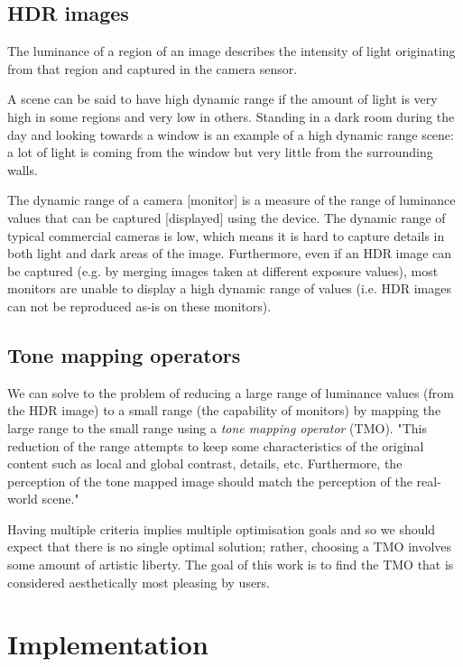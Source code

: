 \documentclass[a4paper]{scrartcl}
\begin{document}
\subsection{HDR images}

The luminance of a region of an image describes the intensity of light originating from that region and captured in the camera sensor.

A scene can be said to have high dynamic range if the amount of light is very high in some regions and very low in others. Standing in a dark room during the day and looking towards a window is an example of a high dynamic range scene: a lot of light is coming from the window but very little from the surrounding walls.

The dynamic range of a camera [monitor] is a measure of the range of luminance values that can be captured [displayed] using the device. The dynamic range of typical commercial cameras is low, which means it is hard to capture details in both light and dark areas of the image. Furthermore, even if an HDR image can be captured (e.g. by merging images taken at different exposure values), most monitors are unable to display a high dynamic range of values (i.e. HDR images can not be reproduced as-is on these monitors).

\subsection{Tone mapping operators}

We can solve to the problem of reducing a large range of luminance values (from the HDR image) to a small range (the capability of monitors) by mapping the large range to the small range using a \emph{tone mapping operator} (TMO). "This reduction of the range attempts to keep some characteristics of the original content such as local and global contrast, details, etc. Furthermore, the perception of the tone mapped image should match the perception of the real-world scene." \cite{Banterle:2011}

Having multiple criteria implies multiple optimisation goals and so we should expect that there is no single optimal solution; rather, choosing a TMO involves some amount of artistic liberty. The goal of this work is to find the TMO that is considered aesthetically most pleasing by users.

\section{Implementation}
\end{document}
